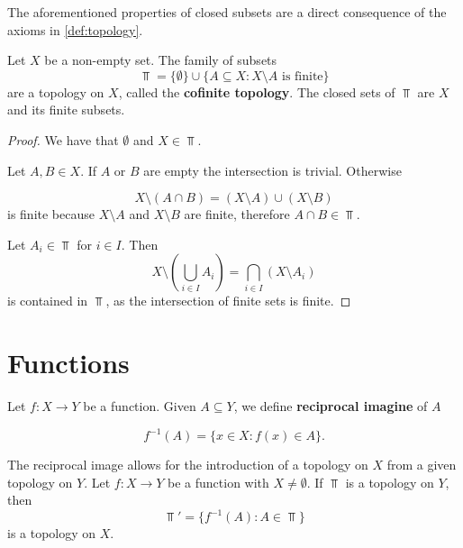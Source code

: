 \documentclass[../../main/main.tex]{subfiles}
\begin{document}
\begin{remark}
  The aforementioned properties of closed subsets are a direct consequence of the axioms in \ref{def:topology}.
\end{remark}

\begin{example}
  Let $X$ be a non-empty set. The family of subsets
  \begin{equation*}
    \Top = \{ \emptyset \} \cup \{A \subseteq X: X \setminus A \text{ is finite}\}
  \end{equation*}
  are a topology on $X$, called the {\bf cofinite topology}. The closed sets of $\Top$ are $X$ and its finite subsets.
\end{example}

\begin{proof}
  We have that $\emptyset$ and $X \in \Top$.

  Let $A, B \in X$. If $A$ or $B$ are empty the intersection is trivial. Otherwise

  \begin{equation*}
    X \setminus (A \cap B) = \left( X \setminus A \right) \cup \left( X \setminus B \right)
  \end{equation*}
  is finite because $X \setminus A$ and $X \setminus B$ are finite, therefore $A \cap B \in \Top$.

  Let $A_{i} \in \Top$ for $i \in I$. Then
  \begin{equation*}
    X \setminus \left( \bigcup_{i \in I} A_{i} \right) =
    \bigcap_{i \in I} \left( X \setminus A_{i} \right)
  \end{equation*}
  is contained in $\Top$, as the intersection of finite sets is finite.
\end{proof}

\section{Functions}
\label{sec:function}

\begin{definition}
Let $f: X \rightarrow Y$ be a function. Given $A \subseteq Y$, we define {\bf reciprocal imagine} of $A$

\begin{equation*}
  f^{-1} (A) = \{x \in X : f(x) \in A\}.
\end{equation*}
\end{definition}

\begin{remark}
The reciprocal image allows for the introduction of a topology on $X$ from a given topology on $Y$. Let $f: X \rightarrow Y$ be a function with $X \neq \emptyset$. If $\Top$ is a topology on $Y$, then
  \begin{equation*}
    \Top' = \{f^{-1}(A) : A \in \Top\}
  \end{equation*}
  is a topology on $X$.
\end{remark}
\end{document}
